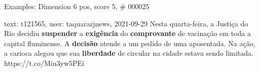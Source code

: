 \begin{frame}{Examples: Dimension 6 pos, score 5, \# 000025}
\footnotesize
\begin{exampleblock}{text: t121565, user: taquararjnews, 2021-09-29}
Nesta quarta-feira, a Justiça do Rio decidiu \textbf{suspender} a 
\textbf{exigência} do \textbf{comprovante} de vacinação em toda a capital 
fluminense. A \textbf{decisão} atende a um pedido de uma aposentada. Na ação, a 
carioca alegou que sua \textbf{liberdade} de circular na cidade estava sendo 
limitada. https://t.co/Miu3yw5PEi 
\end{exampleblock}
\end{frame}
